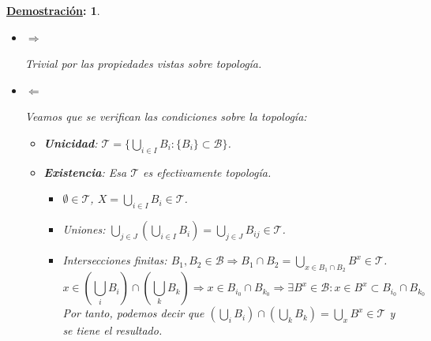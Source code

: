 \documentclass[10pt,a4paper,openright]{book}
\theoremstyle{break}
\newtheorem*{demo}{\underline{Demostración}:}
\begin{document}
\begin{demo}
\begin{itemize}
\item $\Rightarrow$

Trivial por las propiedades vistas sobre topología.

\item $\Leftarrow$

Veamos que se verifican las condiciones sobre la topología:
\begin{itemize}
    \item \textbf{Unicidad}: $\mathcal{T} = \{\bigcup_{i \in  I} B_i: \{B_i\} \subset \mathcal{B}\}$.
    \item \textbf{Existencia}: Esa $\mathcal{T}$ es efectivamente topología. 
        \begin{itemize}
            \item $\emptyset \in \mathcal{T}$, $X = \bigcup_{i\in I} B_i \in \mathcal{T}$.
            \item Uniones: $\bigcup_{j\in J} \left(\bigcup_{i\in I} B_{i}\right) = \bigcup_{j\in J} B_{ij} \in \mathcal{T}$. 
            \item Intersecciones finitas: $B_1, B_2 \in \mathcal{B} \Rightarrow B_1 \cap B_2 = \bigcup_{x \in B_1 \cap B_2} B^x \in \mathcal{T}$.
            $$
            x \in \left( \bigcup_{i} B_i \right) \cap \left( \bigcup_{k} B_k \right) \Rightarrow x \in B_{i_0} \cap B_{k_0} \Rightarrow \exists B^x \in \mathcal{B} : x\in B^x \subset B_{i_0} \cap B_{k_0}
            $$
            Por tanto, podemos decir que $\left( \bigcup_{i} B_i \right) \cap \left( \bigcup_{k} B_k \right) = \bigcup_{x} B^x \in \mathcal{T}
            $ y se tiene el resultado.
        \end{itemize}
\end{itemize}
\end{itemize}
\end{demo}
\end{document}
